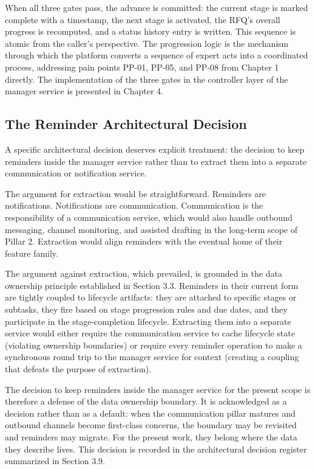 When all three gates pass, the advance is committed: the current stage is marked complete with a timestamp, the next stage is activated, the RFQ's overall progress is recomputed, and a status history entry is written. This sequence is atomic from the caller's perspective. The progression logic is the mechanism through which the platform converts a sequence of expert acts into a coordinated process, addressing pain points PP-01, PP-05, and PP-08 from Chapter 1 directly. The implementation of the three gates in the controller layer of the manager service is presented in Chapter 4.

\subsection*{The Reminder Architectural Decision}
A specific architectural decision deserves explicit treatment: the decision to keep reminders inside the manager service rather than to extract them into a separate communication or notification service.

The argument for extraction would be straightforward. Reminders are notifications. Notifications are communication. Communication is the responsibility of a communication service, which would also handle outbound messaging, channel monitoring, and assisted drafting in the long-term scope of Pillar 2. Extraction would align reminders with the eventual home of their feature family.

The argument against extraction, which prevailed, is grounded in the data ownership principle established in Section 3.3. Reminders in their current form are tightly coupled to lifecycle artifacts: they are attached to specific stages or subtasks, they fire based on stage progression rules and due dates, and they participate in the stage-completion lifecycle. Extracting them into a separate service would either require the communication service to cache lifecycle state (violating ownership boundaries) or require every reminder operation to make a synchronous round trip to the manager service for context (creating a coupling that defeats the purpose of extraction).

The decision to keep reminders inside the manager service for the present scope is therefore a defense of the data ownership boundary. It is acknowledged as a decision rather than as a default: when the communication pillar matures and outbound channels become first-class concerns, the boundary may be revisited and reminders may migrate. For the present work, they belong where the data they describe lives. This decision is recorded in the architectural decision register summarized in Section 3.9.

